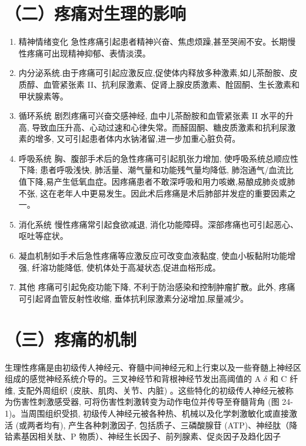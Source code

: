 \documentclass[10pt]{article}
\begin{document}
\section*{（二）疼痛对生理的影响}
\begin{enumerate}
  \item 精神情绪变化 急性疼痛引起患者精神兴奋、焦虑烦躁,甚至哭闹不安。长期慢性疼痛可出现精神抑郁、表情淡漠。

  \item 内分泌系统.由于疼痛可引起应激反应,促使体内释放多种激素,如儿茶酚胺、皮质醇、血管紧张素 II、抗利尿激素、促肾上腺皮质激素、酫固酮、生长激素和甲状腺素等。

  \item 循环系统 剧烈疼痛可兴奋交感神经, 血中儿茶酚胺和血管紧张素 II 水平的升高, 导致血压升高、心动过速和心律失常。而醛固酮、糖皮质激素和抗利尿激素的增多, 又可引起患者体内水钠渚留,进一步加重心脏负荷。

  \item 呼吸系统 胸、腹部手术后的急性疼痛可引起肌张力增加, 使呼吸系统总顺应性下降; 患者呼吸浅快, 肺活量、潮气量和功能残气量均降低, 肺泡通气/血流比值下降,易产生低氧血症。因疼痛患者不敢深呼吸和用力咳嫩,易酿成肺炎或肺不张, 这在老年人中更易发生。因此术后疼痛是术后肺部并发症的重要因素之一。

  \item 消化系统 慢性疼痛常引起食欲减退, 消化功能障碍。深部疼痛也可引起恶心、呕吐等症状。

  \item 凝血机制如手术后急性疼痛等应激反应可改变血液黏度, 使血小板黏附功能增强, 纤溶功能降低, 使机体处于高凝状态,促进血㭲形成。

  \item 其他 疼痛可引起免疫功能下降, 不利于防治感染和控制肿瘤扩散。此外, 疼痛可引起肾血管反射性收缩, 垂体抗利尿激素分泌增加,尿量减少。

\end{enumerate}

\section*{（三）疼痛的机制}
生理性疼痛是由初级传人神经元、脊髓中间神经元和上行束以及一些脊髄上神经区组成的感觉神经系统介导的。三叉神经节和背根神经节发出高阈值的 A $\delta$ 和 C 纤维, 支配外周组织 (皮肤、肌肉、关节、内脏) 。这些特化的初级传人神经元被称为伤害性刺激感受器, 可将伤害性刺激转变为动作电位并传导至脊髓背角 (图 24-1)。当周围组织受损, 初级传人神经元被各种热、机械以及化学刺激敏化或直接激活 (或两者均有), 产生各种刺激因子, 包括质子、三磷酸腺苷 (ATP)、神经肽（降铪素基因相关肽、P 物质）、神经生长因子、前列腺素、促炎因子及趋化因子
\end{document}
